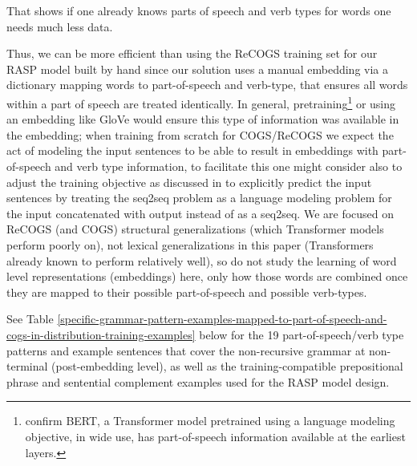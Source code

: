 \documentclass[11pt]{article}
\begin{document}
That shows if one already knows parts of speech and verb types for words one needs much less data.

Thus, we can be more efficient than using the ReCOGS training set for our RASP model built by hand
 since our solution uses a manual embedding via a dictionary mapping words to part-of-speech and verb-type, that ensures all words within a part of speech are treated identically. In general, pretraining\footnote{\cite{tenney2019bertrediscoversclassicalnlp} confirm BERT, a Transformer model pretrained using a language modeling objective, in wide use, has part-of-speech information available at the earliest layers.} or using an embedding like GloVe \cite{pennington-etal-2014-glove} would ensure this type of information was available in the embedding; when training from scratch for COGS/ReCOGS we expect the act of modeling the input sentences to be able to result in embeddings with part-of-speech and verb type information, to facilitate this one might consider also to adjust the training objective as discussed in \cite{10.1162/tacl_a_00733} to explicitly predict the input sentences by treating the seq2seq problem as a language modeling problem for the input concatenated with output instead of as a seq2seq. We are focused on ReCOGS (and COGS) structural generalizations (which Transformer models perform poorly on), not lexical generalizations in this paper (Transformers already known to perform relatively well), so do not study the learning of word level representations (embeddings) here, only how those words are combined once they are mapped to their possible part-of-speech and possible verb-types.

See Table \ref{specific-grammar-pattern-examples-mapped-to-part-of-speech-and-cogs-in-distribution-training-examples} below for the 19 part-of-speech/verb type patterns and example sentences that cover the non-recursive grammar at non-terminal (post-embedding level), as well as the training-compatible prepositional phrase and sentential complement examples used for the RASP model design.
\end{document}
